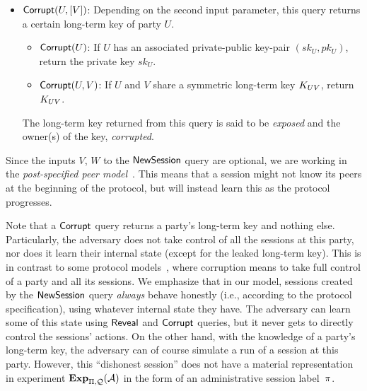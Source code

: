 \begin{itemize}
	
	\item $\mathsf{Corrupt}(U, [V])$:
	Depending on the second input parameter,
	this query returns a certain long-term key of party $U$.
	
	\begin{itemize}
		\item $\mathsf{Corrupt}(U)$: 
		If $U$ has an associated private-public key-pair $(sk_U,pk_U)$,
		return the private key $sk_U$.
		
		\item $\mathsf{Corrupt}(U, V)$:
		If $U$ and $V$ share a symmetric long-term key $K_{UV}$,
		 return $K_{UV}$. 
	\end{itemize}
	The long-term key returned from this query is said to be \emph{exposed}
	and the owner(s) of the key, \emph{corrupted}. 
\end{itemize}

Since the inputs $V$, $W$ to the $\mathsf{NewSession}$ query are optional,
we are working in the \emph{post-specified peer model}~\cite{C:CanKra02}.
This means that a session  might not know its peers at the beginning of the protocol,
but will instead learn this as the protocol progresses.

Note that a $\mathsf{Corrupt}$ query returns a party's long-term key and nothing else.
Particularly,
the adversary does not take control of all the sessions at this party,
nor does it learn their internal state
(except for the leaked long-term key).
This is in contrast to some protocol models~\cite{EC:CanKra01,C:CanKra02},
where corruption means to take full control of a party and all its sessions. 
We emphasize that in our model,
sessions created by the $\mathsf{NewSession}$ query \emph{always} behave honestly
(i.e., according to the protocol specification), using whatever internal state they have.
The adversary can learn some of this state using $\mathsf{Reveal}$ and $\mathsf{Corrupt}$ queries,
but it never gets to directly control the sessions' actions.
On the other hand,
with the knowledge of a party's long-term key,
the adversary can of course simulate a run of a session at this party.
However,
this ``dishonest session'' does not have a material representation in experiment $\mathbf{Exp}_{\mathrm{\Pi},\mathcal{Q}}^{}(\mathcal{A})$ in the form of an administrative session label~$\oracle$.







